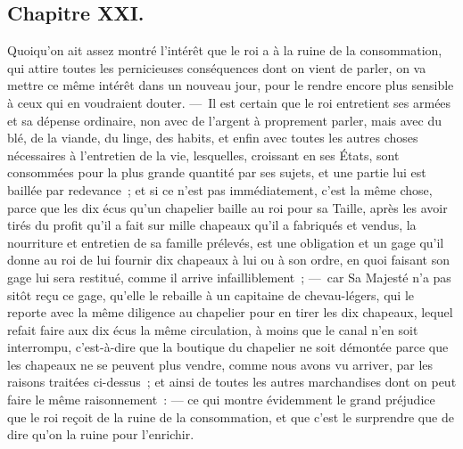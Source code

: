 \documentclass[french,twoside]{book} %
\begin{document}
\subsection[{Chapitre XXI.}]{Chapitre XXI.}
\noindent Quoiqu’on ait assez montré l’intérêt que le roi a à la ruine de la consommation, qui attire toutes les pernicieuses conséquences dont on vient de parler, on va mettre ce même intérêt dans un nouveau jour, pour le rendre encore plus sensible à ceux qui en voudraient douter. — Il est certain que le roi entretient ses armées et sa dépense ordinaire, non avec de l’argent à proprement parler, mais avec du blé, de la viande, du linge, des habits, et enfin avec toutes les autres choses nécessaires à l’entretien de la vie, lesquelles, croissant en ses États, sont consommées pour la plus grande quantité par ses sujets, et une partie lui est baillée par redevance ; et si ce n’est pas immédiatement, c’est la même chose, parce que les dix écus qu’un chapelier baille au roi pour sa Taille, après les avoir tirés du profit qu’il a fait sur mille chapeaux qu’il a fabriqués et vendus, la nourriture et entretien de sa famille prélevés, est une obligation et un gage qu’il donne au roi de lui fournir dix chapeaux à lui ou à son ordre, en quoi faisant son gage lui sera restitué, comme il arrive infailliblement ; — car Sa Majesté n’a pas sitôt reçu ce gage, qu’elle le rebaille à un capitaine de chevau-légers, qui le reporte avec la même diligence au chapelier pour en tirer les dix chapeaux, lequel refait faire aux dix écus la même circulation, à moins que le canal n’en soit interrompu, c’est-à-dire que la boutique du chapelier ne soit démontée parce que les chapeaux ne se peuvent plus vendre, comme nous avons vu arriver, par les raisons traitées ci-dessus ; et ainsi de toutes les autres marchandises dont on peut faire le même raisonnement : — ce qui montre évidemment le grand préjudice que le roi reçoit de la ruine de la consommation, et que c’est le surprendre que de dire qu’on la ruine pour l’enrichir.\par
\end{document}
